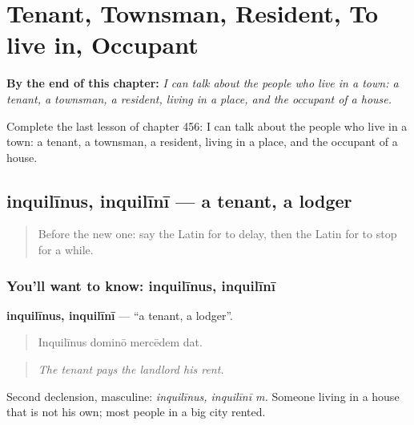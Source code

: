 
\chapter{Tenant, Townsman, Resident, To live in, Occupant}
\label{ch:la-tenant-townsman-resident-to-live-in-occupant}

\begin{chapteropening}
\textbf{By the end of this chapter:} \emph{I can talk about the people who live in a town: a tenant, a townsman, a resident, living in a place, and the occupant of a house.}

Complete the last lesson of chapter 456: I can talk about the people who live in a town: a tenant, a townsman, a resident, living in a place, and the occupant of a house.
\end{chapteropening}

\section[inquilīnus, inquilīnī]{inquilīnus, inquilīnī — a tenant, a lodger}

\label{lesson:LA-C456-inquilinus}



\begin{quote}
Before the new one: say the Latin for to delay, then the Latin for to stop for a while.
\end{quote}

\subsection*{You'll want to know: inquilīnus, inquilīnī}
\textbf{inquilīnus, inquilīnī} — \textquotedblleft{}a tenant, a lodger\textquotedblright{}.

\begin{quote}
Inquilīnus dominō mercēdem dat.
\end{quote}

\begin{quote}
\emph{The tenant pays the landlord his rent.}
\end{quote}

Second declension, masculine: \emph{inquilīnus, inquilīnī m.} Someone living in a house that is not his own; most people in a big city rented.

